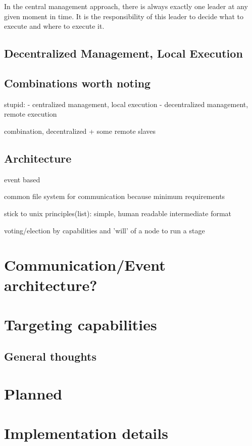 In the central management approach, there is always exactly one leader at any given moment in time.
It is the responsibility of this leader to decide what to execute and where to execute it.

\subsection{Decentralized Management, Local Execution}

\subsection{Combinations worth noting}

stupid:
 - centralized management, local execution
 - decentralized management, remote execution
 
combination, decentralized + some remote slaves

\subsection{Architecture}

event based

common file system for communication because minimum requirements

stick to unix principles(list): simple, human readable intermediate format

voting/election by capabilities and 'will' of a node to run a stage

\section{Communication/Event architecture?}

\section{Targeting capabilities}

\subsection{General thoughts}

\section{Planned}

\section{Implementation details}

